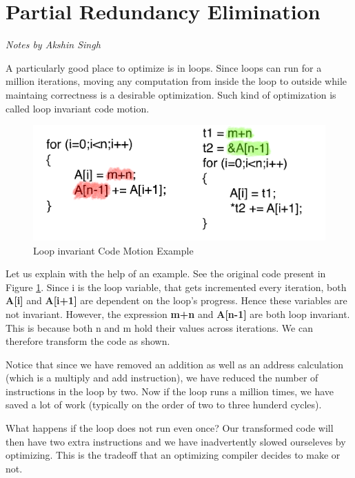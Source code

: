 \section{Partial Redundancy Elimination}
\begin{flushright}
\textit{Notes by Akshin Singh}
\end{flushright}

A particularly good place to optimize is in loops. Since loops can run for a million iterations, moving any computation from 
inside the loop to outside while maintaing correctness is a desirable optimization. Such kind of optimization is called loop invariant
code motion. 

\begin{figure}[h]
\centering
\includegraphics[scale = 0.5]{images/mod_105_fig1.png}
\caption{Loop invariant Code Motion Example}
\label {fig:mod_105_01}
\end{figure}

Let us explain with the help of an example. See the original code present in Figure \ref{fig:mod_105_01}. Since i is the loop variable,
that gets incremented every iteration, both \textbf{A[i]} and \textbf{A[i+1]} are dependent on the loop's progress. Hence these variables
are not invariant. However, the expression \textbf{m+n} and \textbf{A[n-1]} are both loop invariant. This is because both n and m hold their
values across iterations. We can therefore transform the code as shown.

Notice that since we have removed an addition as well as an address calculation (which is a multiply and add instruction), we have reduced
the number of instructions in the loop by two. Now if the loop runs a million times, we have saved a lot of work (typically on the order of 
two to three hunderd cycles). 

What happens if the loop does not run even once? Our transformed code will then have two extra instructions and we have inadvertently slowed
ourseleves by optimizing. This is the tradeoff that an optimizing compiler decides to make or not. 

